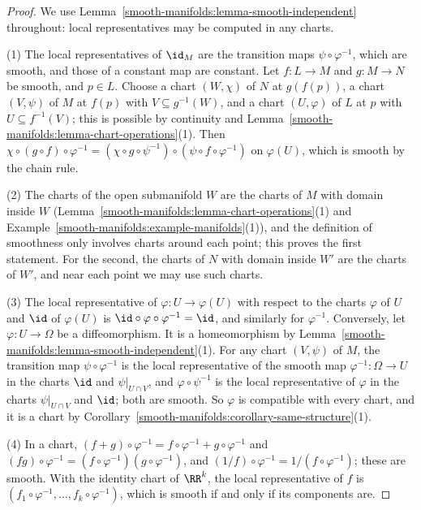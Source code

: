 \begin{proof}
We use Lemma~\ref{smooth-manifolds:lemma-smooth-independent} throughout: local representatives may be computed in any charts.

(1) The local representatives of $\id_M$ are the transition maps $\psi \circ \varphi^{-1}$, which are smooth, and those of a constant map are constant. Let
$f \colon L \to M$ and $g \colon M \to N$ be smooth, and $p \in L$. Choose a chart $(W, \chi)$ of $N$ at $g(f(p))$, a chart $(V, \psi)$ of $M$ at $f(p)$
with $V \subseteq g^{-1}(W)$, and a chart $(U, \varphi)$ of $L$ at $p$ with $U \subseteq f^{-1}(V)$; this is possible by continuity and
Lemma~\ref{smooth-manifolds:lemma-chart-operations}(1). Then $\chi \circ (g \circ f) \circ \varphi^{-1} = (\chi \circ g \circ \psi^{-1}) \circ
(\psi \circ f \circ \varphi^{-1})$ on $\varphi(U)$, which is smooth by the chain rule.

(2) The charts of the open submanifold $W$ are the charts of $M$ with domain inside $W$ (Lemma~\ref{smooth-manifolds:lemma-chart-operations}(1) and
Example~\ref{smooth-manifolds:example-manifolds}(1)), and the definition of smoothness only involves charts around each point; this proves the first
statement. For the second, the charts of $N$ with domain inside $W'$ are the charts of $W'$, and near each point we may use such charts.

(3) The local representative of $\varphi \colon U \to \varphi(U)$ with respect to the charts $\varphi$ of $U$ and $\id$ of $\varphi(U)$ is
$\id \circ \varphi \circ \varphi^{-1} = \id$, and similarly for $\varphi^{-1}$. Conversely, let $\varphi \colon U \to \Omega$ be a diffeomorphism. It is a
homeomorphism by Lemma~\ref{smooth-manifolds:lemma-smooth-independent}(1). For any chart $(V, \psi)$ of $M$, the transition map $\psi \circ \varphi^{-1}$ is the
local representative of the smooth map $\varphi^{-1} \colon \Omega \to U$ in the charts $\id$ and $\psi|_{U \cap V}$, and $\varphi \circ \psi^{-1}$ is the
local representative of $\varphi$ in the charts $\psi|_{U \cap V}$ and $\id$; both are smooth. So $\varphi$ is compatible with every chart, and it is a chart
by Corollary~\ref{smooth-manifolds:corollary-same-structure}(1).

(4) In a chart, $(f + g) \circ \varphi^{-1} = f \circ \varphi^{-1} + g \circ \varphi^{-1}$ and $(fg) \circ \varphi^{-1} = (f \circ \varphi^{-1})(g \circ \varphi^{-1})$,
and $(1/f) \circ \varphi^{-1} = 1/(f \circ \varphi^{-1})$; these are smooth. With the identity chart of $\RR^k$, the local representative of $f$ is
$(f_1 \circ \varphi^{-1}, \ldots, f_k \circ \varphi^{-1})$, which is smooth if and only if its components are.


\end{proof}
